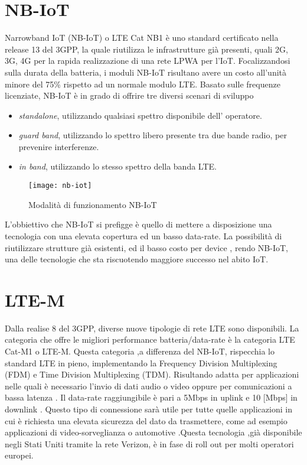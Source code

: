 \section{NB-IoT}
Narrowband IoT (NB-IoT) o LTE Cat NB1 è uno standard certificato nella release 13 del 3GPP, la
quale riutilizza le infrastrutture già presenti, quali 2G, 3G, 4G per la rapida
realizzazione di una rete LPWA per l'IoT.
Focalizzandosi sulla durata della batteria, i moduli NB-IoT risultano avere un
costo all'unità minore del 75\% rispetto ad un normale modulo LTE.
Basato sulle frequenze licenziate, NB-IoT è in grado di
offrire tre diversi scenari di sviluppo \cite{NB-white_paper}
\begin{itemize}
\item \emph{standalone}, utilizzando qualsiasi spettro disponibile dell'
operatore.
\item \emph{guard band}, utilizzando lo spettro libero presente tra due bande
radio, per prevenire interferenze.
\item \emph{in band}, utilizzando lo stesso spettro della banda LTE.
\end{itemize}
\begin{figure}[ht]
    \centering 
        \texttt{[image: nb-iot]}
    \caption{Modalità di funzionamento NB-IoT}
\end{figure}
L'obbiettivo che NB-IoT si prefigge è quello di mettere a disposizione una
tecnologia con una elevata copertura ed un basso data-rate. La possibilità di
riutilizzare strutture già esistenti, ed il basso costo per device , rendo
NB-IoT, una delle tecnologie che sta riscuotendo maggiore successo nel abito IoT.



\section{LTE-M}
Dalla realise 8 del 3GPP, diverse nuove tipologie di rete LTE sono disponibili.
La categoria che offre le migliori performance batteria/data-rate è la categoria
LTE Cat-M1 o LTE-M.
Questa categoria ,a differenza del NB-IoT, rispecchia lo standard LTE in pieno, 
implementando  la Frequency Division Multiplexing
(FDM) e Time Division Multiplexing (TDM). Risultando adatta per applicazioni
nelle quali è necessario l'invio di dati audio o video oppure per comunicazioni a
bassa latenza . Il data-rate raggiungibile è pari a 5Mbps in
uplink e 10 [Mbps] in downlink .  Questo tipo di connessione sarà utile
per tutte quelle applicazioni in cui è richiesta una elevata sicurezza del dato
da trasmettere, come ad esempio applicazioni di video-sorveglianza o automotive
.Questa tecnologia ,già disponibile negli Stati Uniti tramite la rete Verizon, è
in fase di roll out per molti operatori europei.

